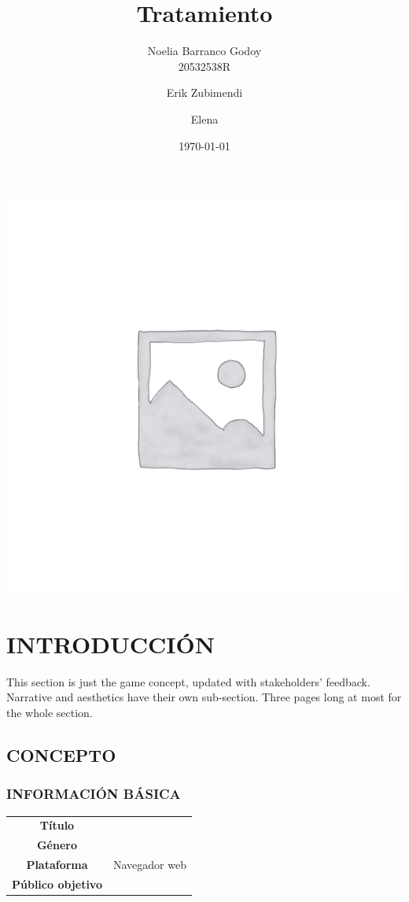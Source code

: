 \documentclass{article}
\title{Tratamiento} %
\author{Noelia Barranco Godoy \\ 20532538R
\and Erik Zubimendi \and Elena } %
\date{\today} %
\begin{document}
    \begin{titlepage}
        \maketitle
        \thispagestyle{empty}
        \begin{center}
            \includegraphics[scale=0.5]{placeholder.png} %
        \end{center} 
    \end{titlepage}
        

        
    \tableofcontents
    \newpage
    
    \section{INTRODUCCIÓN}
    This section is just the game concept, updated with stakeholders’ feedback. Narrative and aesthetics have their own sub-section. Three pages long at most for the whole section.

    \subsection{CONCEPTO}
    \subsubsection{INFORMACIÓN BÁSICA}
    \begin{tabular}{||c|c||}
        \hline
        \textbf{Título} & \\
        \textbf{Género} & \\
        \textbf{Plataforma} & Navegador web\\
        \textbf{Público objetivo} & \\
        \hline
    \end{tabular}
\end{document}
